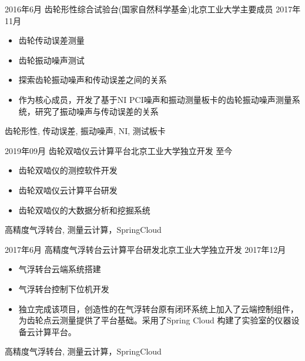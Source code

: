 \begin{experiences}
  \emptySeparator
  \experience
  {2016年6月} {齿轮形性综合试验台(国家自然科学基金)}{北京工业大学}{主要成员}
  {2017年11月 }    {
    \begin{itemize}
      \item 齿轮传动误差测量
      \item 齿轮振动噪声测试
      \item 探索齿轮振动噪声和传动误差之间的关系
      \item 作为核心成员，开发了基于NI PCI噪声和振动测量板卡的齿轮振动噪声测量系统，研究了振动噪声与传动误差的关系
    \end{itemize}
  }
  {齿轮形性, 传动误差, 振动噪声, NI, 测试板卡}

  \emptySeparator
  \experience
  {2019年09月} {齿轮双啮仪云计算平台}{北京工业大学}{独立开发}
  {至今}    {
    \begin{itemize}
      \item 齿轮双啮仪的测控软件开发
      \item 齿轮双啮仪云计算平台研发
      \item 齿轮双啮仪的大数据分析和挖掘系统
    \end{itemize}
  }
  {高精度气浮转台, 测量云计算，SpringCloud}

  \emptySeparator
  \experience
  {2017年6月} {高精度气浮转台云计算平台研发}{北京工业大学}{独立开发}
  {2017年12月}    {
    \begin{itemize}
      \item 气浮转台云端系统搭建
      \item 气浮转台控制下位机开发
      \item 独立完成该项目，创造性的在气浮转台原有闭环系统上加入了云端控制组件，为齿轮点云测量提供了平台基础。采用了Spring Cloud 构建了实验室的仪器设备云计算平台。
    \end{itemize}
  }
  {高精度气浮转台, 测量云计算，SpringCloud}


\end{experiences}
